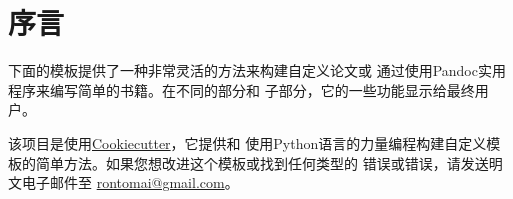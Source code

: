 
\chapter*{序言}


下面的模板提供了一种非常灵活的方法来构建自定义论文或
通过使用Pandoc实用程序来编写简单的书籍。在不同的部分和
子部分，它的一些功能显示给最终用户。

该项目是使用\href{https://cookiecutter.readthedocs.io}{Cookiecutter}，它提供和
使用Python语言的力量编程构建自定义模板的简单方法。如果您想改进这个模板或找到任何类型的
错误或错误，请发送明文电子邮件至
\href{rontomai@gmail.com}{rontomai@gmail.com}。
